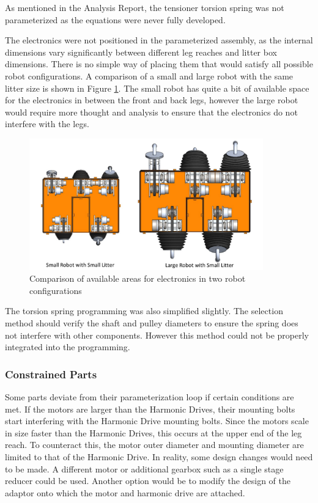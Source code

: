 As mentioned in the Analysis Report, the tensioner torsion spring was not parameterized as the equations were never fully developed.

The electronics were not positioned in the parameterized assembly, as the internal dimensions vary significantly between different leg reaches and litter box dimensions. There is no simple way of placing them that would satisfy all possible robot configurations. A comparison of a small and large robot with the same litter size is shown in Figure \ref{fig:elec}. The small robot has quite a bit of available space for the electronics in between the front and back legs, however the large robot would require more thought and analysis to ensure that the electronics do not interfere with the legs. 

\begin{figure}[H]
    \centering
    \includegraphics[width=0.9\textwidth]{3_Parametrization/img/ElectronicsA.jpg}
    \caption{Comparison of available areas for electronics in two robot configurations}
    \label{fig:elec}
\end{figure}

The torsion spring programming was also simplified slightly. The selection method should verify the shaft and pulley diameters to ensure the spring does not interfere with other components. However this method could not be properly integrated into the programming.



\subsubsection{Constrained Parts} \label{ssub_sec:constrained_parts}

Some parts deviate from their parameterization loop if certain conditions are met.
If the motors are larger than the Harmonic Drives, their mounting bolts start interfering with the Harmonic Drive mounting bolts.
Since the motors scale in size faster than the Harmonic Drives, this occurs at the upper end of the leg reach.
To counteract this, the motor outer diameter and mounting diameter are limited to that of the Harmonic Drive.
In reality, some design changes would need to be made. A different motor or additional gearbox such as a single stage reducer could be used. Another option would be to modify the design of the adaptor onto which the motor and harmonic drive are attached.

